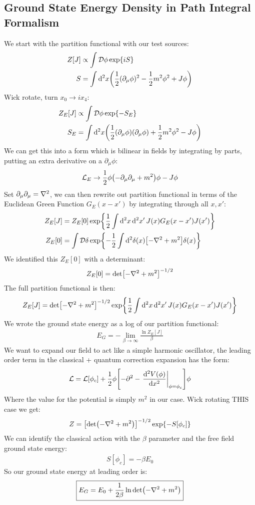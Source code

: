 \documentclass[12pt]{article}
\renewcommand{\L}{\mathcal{L}}
\newcommand{\cD}{\mathcal{D}}
\newcommand{\D}{\partial}
\begin{document}
\subsection{Ground State Energy Density in Path Integral Formalism}
We start with the partition functional with our test sources:
\begin{align*}
  Z[J]&\propto\int\cD\phi\exp{iS}\\
  S&=\int\dd[2]x\qty(\frac12(\D_\mu\phi)^2-\frac12m^2\phi^2+J\phi)
\end{align*}
Wick rotate, turn $x_0\to ix_4$:
\begin{align*}
  Z_E[J]&\propto\int\cD\phi\exp{-S_E}\\
  S_E&=\int\dd[2]x\qty(\frac12(\D_\mu\phi)(\D_\mu\phi)+\frac12m^2\phi^2-J\phi)
\end{align*}
We can get this into a form which is bilinear in fields by integrating by parts, putting an extra derivative on a $\D_\mu\phi$:
\begin{align*}
  \L_E\to\frac12\phi\qty(-\D_\mu\D_\mu+m^2)\phi-J\phi
\end{align*}
Set $\D_\mu\D_\mu=\laplacian$, we can then rewrite out partition functional in terms of the Euclidean Green Function $G_E(x-x')$ by integrating through all $x,x'$:
\begin{align*}
  Z_E[J]&=Z_E[0]\exp{\frac{1}{2}\int\dd[2]x\dd[2]{x'}J(x)G_E(x-x')J(x')}\\
  Z_E[0]&=\int\cD\delta\exp{-\frac12
    \int\dd[2]\delta(x)\qty[-\laplacian+m^2]\delta(x)}
\end{align*}
We identified this $Z_E[0]$ with a determinant:
\begin{align*}
  Z_E[0]=\det[-\laplacian+m^2]^{-1/2}
\end{align*}
The full partition functional is then:
\begin{align*}
  Z_E[J]=\det[-\laplacian+m^2]^{-1/2}
  \exp{\frac{1}{2}\int\dd[2]x\dd[2]{x'}J(x)G_E(x-x')J(x')}
\end{align*}
We wrote the ground state energy as a log of our partition functional:
\begin{align*}
  E_G=-\lim_{\beta\to\infty}\frac{\ln Z_E[J]}{\beta}
\end{align*}
We want to expand our field to act like a simple harmonic oscillator, the leading order term in the classical + quantum correction expansion has the form:
\begin{align*}
  \L=\L[\phi_c]+\frac12\phi\qty[-\D^2
  -\eval{\dv[2]{V(\phi)}{x}}_{\phi=\phi_c}]\phi
\end{align*}
Where the value for the potential is simply $m^2$ in our case. Wick rotating THIS case we get:
\begin{align*}
  Z=\qty[\det(-\laplacian+m^2)]^{-1/2}\exp{-S[\phi_c]}
\end{align*}
We can identify the classical action with the $\beta$ parameter and the free field ground state energy:
\begin{align*}
  S[\phi_c]=-\beta E_0
\end{align*}
So our ground state energy at leading order is:
\begin{align*}
  \boxed{E_G=E_0+\frac{1}{2\beta}\ln\det(-\laplacian+m^2)}
\end{align*}
\end{document}
